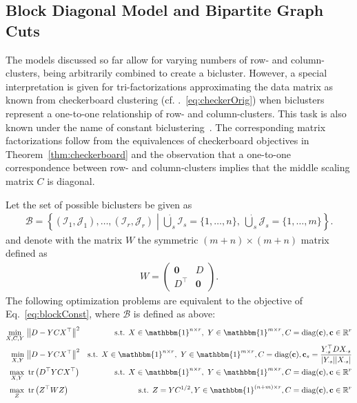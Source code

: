 \subsection{Block Diagonal Model and Bipartite Graph Cuts}
The models discussed so far allow for varying numbers of row- and column-clusters, being arbitrarily combined to create a bicluster. However, a special interpretation is given for tri-factorizations approximating the data matrix as known from checkerboard clustering (cf. \@Eq.~\eqref{eq:checkerOrig}) when biclusters represent a one-to-one relationship of row- and column-clusters. This task is also known under the name of constant biclustering~\citep{madeira2004biclustering}. The corresponding matrix factorizations follow from the equivalences of checkerboard objectives in Theorem~\ref{thm:checkerboard} and the observation that a one-to-one correspondence between row- and column-clusters implies that the middle scaling matrix $C$ is diagonal.
\begin{corollary}\label{thm:blockdiagonal}
Let the set of possible biclusters be given as
\begin{align*}
    \mathcal{B} = \left\{(\mathcal{I}_1,\mathcal{J}_1),\ldots, (\mathcal{I}_r,\mathcal{J}_r)\middle\vert \dot\bigcup_{s}\mathcal{I}_s=\{1,\ldots,n\},\  \dot\bigcup_{s}\mathcal{J}_s=\{1,\ldots,m\}\right\}.
\end{align*}
and denote with the matrix $W$ the symmetric $(m+ n)\times (m+n)$ matrix defined as
\begin{align*}
   W=
\begin{pmatrix}
\mathbf{0} & D\\
D^\top & \mathbf{0}
\end{pmatrix}. 
\end{align*}
The following optimization problems are equivalent to the objective of Eq.~\eqref{eq:blockConst}, where $\mathcal{B}$ is defined as above:
\begin{align}
    \label{eq:blockDiagC}
    \min_{X,C,Y}&\ \bigl\lVert D-YCX^\top\bigr\rVert ^2 &
    \text{s.t. } X\in \mathbbm{1}^{n\times r},\ Y\in\mathbbm{1}^{m\times r},C=\diag(\mathbf{c}), \mathbf{c}\in\mathbb{R}^{r}\\ 
    \label{eq:blockDiagAvg}
\min_{X,Y}&\ \bigl\lVert D-YCX^\top\bigr\rVert ^2&
\text{s.t. } X\in \mathbbm{1}^{n\times r},\ Y\in\mathbbm{1}^{m\times r}, C=\diag(\mathbf{c}), \mathbf{c}_s= \frac{Y_{\cdot s}^\top D X_{\cdot s}}{\lvert Y_{\cdot s}\rvert \lvert X_{\cdot s}\rvert }\\
\label{eq:blockDiagtr}
\max_{X,Y}&\ \tr\left(D^\top YCX^\top\right) &
\text{s.t. } X\in \mathbbm{1}^{n\times r},\ Y\in\mathbbm{1}^{m\times r},C=\diag(\mathbf{c}),\mathbf{c}\in\mathbb{R}^{r}\\
\label{eq:blockDiagW}
\max_{Z}&\ \tr\left(Z^\top WZ\right) &
\text{s.t. }  Z=YC^{1/2},Y\in \mathbbm{1}^{(n+m)\times r}, C=\diag(\mathbf{c}),\mathbf{c}\in\mathbb{R}^{r}
\end{align}
\end{corollary}
